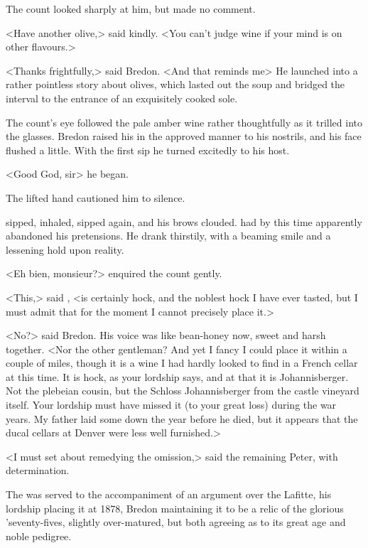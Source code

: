 The count looked sharply at him, but made no comment.

<Have another olive,> said  kindly. <You can't judge wine if your mind is on other flavours.>

<Thanks frightfully,> said Bredon. <And that reminds me\longdash> He launched into a rather pointless story about olives, which lasted out the soup and bridged the interval to the entrance of an exquisitely cooked sole.

The count's eye followed the pale amber wine rather thoughtfully as it trilled into the glasses. Bredon raised his in the approved manner to his nostrils, and his face flushed a little. With the first sip he turned excitedly to his host.

<Good God, sir\longdash> he began.

The lifted hand cautioned him to silence.

 sipped, inhaled, sipped again, and his brows clouded.  had by this time apparently abandoned his pretensions. He drank thirstily, with a beaming smile and a lessening hold upon reality.

<Eh bien, monsieur?> enquired the count gently.

<This,> said , <is certainly hock, and the noblest hock I have ever tasted, but I must admit that for the moment I cannot precisely place it.>

<No?> said Bredon. His voice was like bean-honey now, sweet and harsh together. <Nor the other gentleman? And yet I fancy I could place it within a couple of miles, though it is a wine I had hardly looked to find in a French cellar at this time. It is hock, as your lordship says, and at that it is Johannisberger. Not the plebeian cousin, but the  Schloss Johannisberger from the castle vineyard itself. Your lordship must have missed it (to your great loss) during the war years. My father laid some down the year before he died, but it appears that the ducal cellars at Denver were less well furnished.>

<I must set about remedying the omission,> said the remaining Peter, with determination.

The  was served to the accompaniment of an argument over the Lafitte, his lordship placing it at 1878, Bredon maintaining it to be a relic of the glorious 'seventy-fives, slightly over-matured, but both agreeing as to its great age and noble pedigree.

